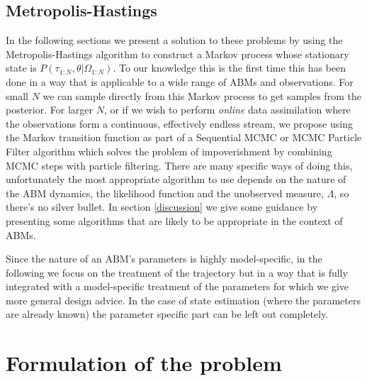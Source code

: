 \documentclass{article}
\begin{document}
\subsection{Metropolis-Hastings}
In the following sections we present a solution to these problems by using the Metropolis-Hastings algorithm to construct a Markov process whose stationary state is $P(\tau_{1:N},\theta|\Omega_{1:N})$. To our knowledge this is the first time this has been done in a way that is applicable to a wide range of ABMs and observations. For small $N$ we can sample directly from this Markov process to get samples from the posterior. For larger $N$, or if we wish to perform \textit{online} data assimilation where the observations form a continuous, effectively endless stream, we propose using the Markov transition function as part of a Sequential MCMC or MCMC Particle Filter algorithm \citep*{finke2020limit, septier2009mcmc} which solves the problem of impoverishment by combining MCMC steps with particle filtering. There are many specific ways of doing this, unfortunately the most appropriate algorithm to use depends on the nature of the ABM dynamics, the likelihood function and the unobserved measure, $\Lambda$, so there's no silver bullet. In section \ref{discussion} we give some guidance by presenting some algorithms that are likely to be appropriate in the context of ABMs.

Since the nature of an ABM's parameters is highly model-specific, in the following we focus on the treatment of the trajectory but in a way that is fully integrated with a model-specific treatment of the parameters for which we give more general design advice. In the case of state estimation (where the parameters are already known) the parameter specific part can be left out completely.

\section{Formulation of the problem}
\end{document}

